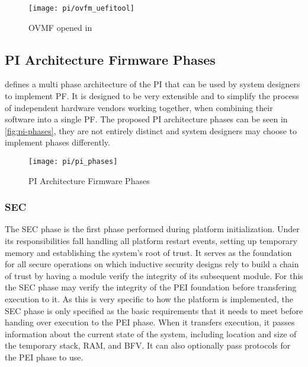 
\begin{figure}[htb]%
    \centering%
    \texttt{[image: pi/ovfm\_uefitool]}%
    \caption{\ac{OVMF} opened in }%
    \label{fig:ovmf-in-uefitool}%
\end{figure}


\subsection{\acs{PI} Architecture Firmware Phases}

\cite{pi-spec} defines a multi phase architecture of the \ac{PI} that can be used by system designers to implement \ac{PF}.
It is designed to be very extensible and to simplify the process of independent hardware vendors working together, when combining their software into a single \ac{PF}.
The proposed \ac{PI} architecture phases can be seen in \autoref{fig:pi-phases}, they are not entirely distinct and system designers may choose to implement phases differently.

\begin{figure}[htb]%
    \centering%
    \texttt{[image: pi/pi\_phases]}%
    \caption{\ac{PI} Architecture Firmware Phases \cite[Figure 2-1]{pi-spec}}%
    \label{fig:pi-phases}%
\end{figure}


\subsubsection{\acf{SEC}}

The \ac{SEC} phase is the first phase performed during platform initialization.
Under its responsibilities fall handling all platform restart events, setting up temporary memory and establishing the system's root of trust.
It serves as the foundation for all secure operations on which inductive security designs rely to build a chain of trust by having a module verify the integrity of its subsequent module.
For this the \ac{SEC} phase may verify the integrity of the \ac{PEI} foundation before transfering execution to it.
As this is very specific to how the platform is implemented, the \ac{SEC} phase is only specified as the basic requirements that it needs to meet before handing over execution to the \ac{PEI} phase.
When it transfers execution, it passes information about the current state of the system, including location and size of the temporary stack, \ac{RAM}, and \ac{BFV}.
It can also optionally pass protocols for the \ac{PEI} phase to use.

